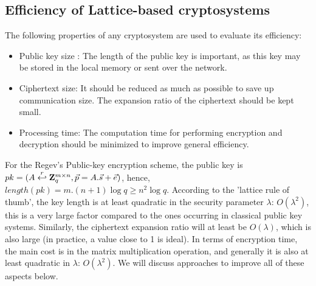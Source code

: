 \begin{description}



\end{description}

\subsection{Efficiency of Lattice-based cryptosystems}
\label{sec:latticeEfficiency}

The following properties of any cryptosystem are used to evaluate its efficiency:
\begin{itemize}
\item Public key size : The length of the public key is important, as this key may be stored in the local memory or sent over the network.
\item Ciphertext size: It should be reduced as much as possible to save up communication size. The
  expansion ratio of the ciphertext should be kept small.
\item Processing time: The computation time for performing encryption and decryption should be minimized to improve general efficiency.
\end{itemize}
For the Regev's Public-key encryption scheme, the public key is
$pk=(A \stackrel{r}{\hookleftarrow} \mathbf{Z}_q^{m \times n}, \vec{p} = A.\vec{s} + \vec{e})$,
hence, $length(pk) = m.(n+1)\log q \geq n^2\log q$. According to the 'lattice
rule of thumb', the key length is at least quadratic in the
security parameter $\lambda$: $O(\lambda^2)$, this is a very large factor
compared to the ones occurring in classical public key systems.  Similarly, the
ciphertext expansion ratio will at least be $O(\lambda)$, which is also large (in
practice, a value close to 1 is ideal). In terms of encryption time,
the main cost is in the matrix multiplication operation, and generally it is
also at least quadratic in $\lambda$: $O(\lambda^2)$. We will discuss approaches
to improve all of these aspects below.

